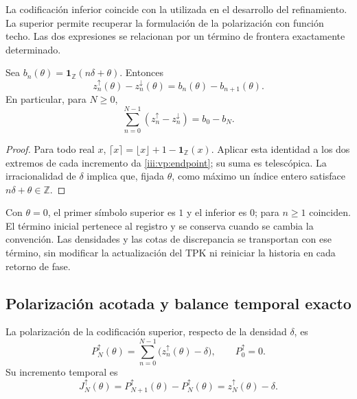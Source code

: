 La codificación inferior coincide con la utilizada en el desarrollo
del refinamiento. La superior permite recuperar la formulación de la
polarización con función techo. Las dos expresiones se relacionan por
un término de frontera exactamente determinado.

\begin{proposition}
Sea $b_n(\theta)=\mathbf1_{\mathbb Z}(n\delta+\theta)$. Entonces
\begin{equation}
 z_n^{\uparrow}(\theta)-z_n^{\downarrow}(\theta)
 =b_n(\theta)-b_{n+1}(\theta).
 \label{iii:vp:endpoint}
\end{equation}
En particular, para $N\geq0$,
\[
 \sum_{n=0}^{N-1}(z_n^{\uparrow}-z_n^{\downarrow})
 =b_0-b_N.
\]
\end{proposition}
\begin{proof}
Para todo real $x$, $\lceil x\rceil=\lfloor x\rfloor+1-
\mathbf1_{\mathbb Z}(x)$. Aplicar esta identidad a los dos extremos
de cada incremento da \eqref{iii:vp:endpoint}; su suma es telescópica.
La irracionalidad de $\delta$ implica que, fijada $\theta$, como máximo
un índice entero satisface $n\delta+\theta\in\mathbb Z$.
\end{proof}

Con $\theta=0$, el primer símbolo superior es $1$ y el inferior es $0$;
para $n\geq1$ coinciden. El término inicial pertenece al registro y se
conserva cuando se cambia la convención. Las densidades y las cotas de
discrepancia se transportan con ese término, sin modificar la actualización
del TPK ni reiniciar la historia en cada retorno de fase.

\subsection{Polarización acotada y balance temporal exacto}

\begin{definition}
La polarización de la codificación superior, respecto de la densidad
$\delta$, es
\begin{equation}
 P_N^{\uparrow}(\theta)
 =\sum_{n=0}^{N-1}\bigl(z_n^{\uparrow}(\theta)-\delta\bigr),
 \qquad P_0^{\uparrow}=0.
 \label{iii:vp:polarization}
\end{equation}
Su incremento temporal es
\begin{equation}
 J_N^{\uparrow}(\theta)
 =P_{N+1}^{\uparrow}(\theta)-P_N^{\uparrow}(\theta)
 =z_N^{\uparrow}(\theta)-\delta.
 \label{iii:vp:current}
\end{equation}
\end{definition}

